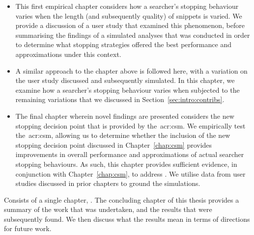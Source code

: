 \begin{itemize}
    \item[]{ This first empirical chapter considers how a searcher's stopping behaviour varies when the length (and subsequently quality) of snippets is varied. We provide a discussion of a user study that examined this phenomenon, before summarising the findings of a simulated analyses that was conducted in order to determine what stopping strategies offered the best performance and approximations under this context.}
    
    \item[]{ A similar approach to the chapter above is followed here, with a variation on the user study discussed and subsequently simulated. In this chapter, we examine how a searcher's stopping behaviour varies when subjected to the remaining variations that we discussed in Section~\ref{sec:intro:contribs}.}
    
    \item[]{ The final chapter wherein novel findings are presented considers the new stopping decision point that is provided by the~\gls{acr:csm}. We empirically test the~\gls{acr:csm}, allowing us to determine whether the inclusion of the new stopping decision point discussed in Chapter~\ref{chap:csm} provides improvements in overall performance and approximations of actual searcher stopping behaviours. As such, this chapter provides sufficient evidence, in conjunction with Chapter~\ref{chap:csm}, to address . We utilise data from user studies discussed in prior chapters to ground the simulations.}
\end{itemize}

\noindent
{} Consists of a single chapter, . The concluding chapter of this thesis provides a summary of the work that was undertaken, and the results that were subsequently found. We then discuss what the results mean in terms of directions for future work.